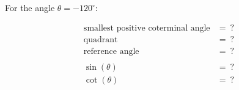 For the angle $\theta = -120^{\circ}$:

$$
\begin{align*}
  \text{smallest positive coterminal angle} &=\ ? \\
  \text{quadrant} &=\ ? \\
  \text{reference angle} &=\ ? \\
  \\
  \sin(\theta) &=\ ? \\
  \cot(\theta) &=\ ?
\end{align*}
$$
